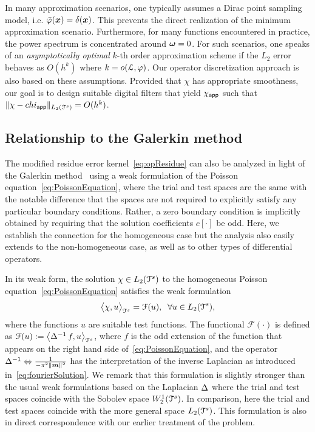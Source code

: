 In many approximation scenarios, one typically assumes a Dirac point sampling model, i.e. ${\bar{\varphi}}(\boldsymbol{x}) = \delta(\boldsymbol{x})$.
This prevents the direct realization of the minimum approximation scenario. 
Furthermore, for many functions encountered in practice, the power spectrum is concentrated around $\boldsymbol{\omega} = 0$. 
For such scenarios, one speaks of an \emph{asymptotically optimal} $k$-th order approximation scheme if the $L_2$ error behaves as $O(h^k)$ where $k = o(\mathcal{L},\varphi)$. 
Our operator discretization approach is also based on these assumptions. 
Provided that $\chi$ has appropriate smoothness, our goal is to design suitable digital filters that yield  $\chi_{\mathsf{app}}$ such that $\lVert \chi - chi_{\mathsf{app}} \rVert_{L_2(\mathcal{T}^s)} = O(h^k)$. 

\subsection{Relationship to the Galerkin method}
\label{sec:Galerkin}
The modified residue error kernel~\eqref{eq:opResidue} can also be analyzed in light of the Galerkin method~\cite{quarteroni08} using a weak formulation of the Poisson equation~\eqref{eq:PoissonEquation}, where the trial and test spaces are the same with the notable difference that the spaces are not required to explicitly satisfy any particular boundary conditions. 
Rather, a zero boundary condition is implicitly obtained by requiring that the solution coefficients $c[\cdot]$ be odd. 
Here, we establish the connection for the homogeneous case but the analysis also easily extends to the non-homogeneous case, as well as to other types of differential operators.

In its weak form, the solution $\chi \in L_2(\mathcal{T}^s)$ to the homogeneous Poisson equation~\eqref{eq:PoissonEquation} satisfies the weak formulation
\begin{equation}
  \bigl \langle \chi , u \bigr \rangle_{\mathcal{T}^s} = \mathcal{F}(u), \;\; \forall u \in L_2(\mathcal{T}^s),
\end{equation}
where the functions $u$ are suitable test functions. 
The functional $\mathcal{F}(\cdot)$ is defined as $\mathcal{F}(u) := \bigl \langle \mathop{\Delta^{-1}} f , u \bigr \rangle_{\mathcal{T}^s}$, where $f$ is the odd extension of the function that appears on the right hand side
of~\eqref{eq:PoissonEquation}, and the operator $\mathop{\Delta^{-1}} \Leftrightarrow \tfrac{1}{-\pi^2\lVert\boldsymbol{m}\rVert^2}$ has the interpretation of the inverse Laplacian as introduced in~\eqref{eq:fourierSolution}. We remark that this formulation is slightly stronger than the usual weak formulations based on the Laplacian $\mathop{\Delta}$ where the trial and test spaces coincide with the Sobolev space $W_2^1(\mathcal{T}^s)$. 
In comparison, here the trial and test spaces coincide with the more general space $L_2(\mathcal{T}^s)$. This formulation is also in direct correspondence with our earlier treatment of the problem.


